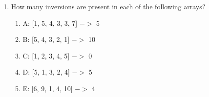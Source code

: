 \documentclass[11pt]{article}
\begin{document}
\begin{enumerate}[leftmargin=*]
    \item How many inversions are present in each of the following arrays?
    \begin{enumerate}
            \item[] A: [1, 5, 4, 3, 3, 7] $->$ 5
            \item[] B: [5, 4, 3, 2, 1] $->$ 10
            \item[] C: [1, 2, 3, 4, 5] $->$ 0
            \item[] D: [5, 1, 3, 2, 4] $->$ 5
            \item[] E: [6, 9, 1, 4, 10] $->$ 4
    \end{enumerate}
    
\end{enumerate}

\label{r:lastpage}
\end{document}
